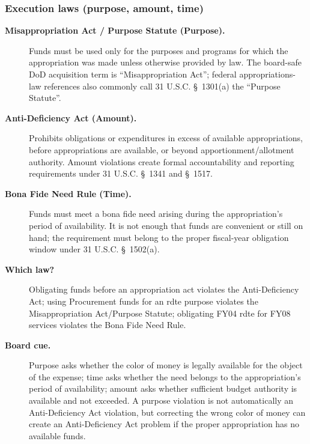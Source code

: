 \documentclass[../main.tex]{subfiles}
\begin{document}
\subsubsection{Execution laws (purpose, amount, time)}
\begin{description}
  \item[\textbf{Misappropriation Act / Purpose Statute (Purpose).}] Funds must be used only for the purposes and programs for which the appropriation was made unless otherwise provided by law. The board-safe DoD acquisition term is ``Misappropriation Act''; federal appropriations-law references also commonly call 31 U.S.C. \S~1301(a) the ``Purpose Statute''\autocite{edo-3-1-4-budget-execution-2025,USC-1301-Purpose,DAU-Misappropriation-Act}.
  \item[\textbf{Anti-Deficiency Act (Amount).}] Prohibits obligations or expenditures in excess of available appropriations, before appropriations are available, or beyond apportionment/allotment authority. Amount violations create formal accountability and reporting requirements under 31 U.S.C. \S~1341 and \S~1517\autocite{edo-3-1-4-budget-execution-2025,USC-1341-ADA,USC-1517-ADA}.
  \item[\textbf{Bona Fide Need Rule (Time).}] Funds must meet a bona fide need arising during the appropriation's period of availability. It is not enough that funds are convenient or still on hand; the requirement must belong to the proper fiscal-year obligation window under 31 U.S.C. \S~1502(a)\autocite{edo-3-1-4-budget-execution-2025,USC-1502-BFN,DAU-Bona-Fide-Need}.
\end{description}

\begin{description}
  \item[\textbf{Which law?}] Obligating funds before an appropriation act violates the Anti-Deficiency Act; using Procurement funds for an \ac{rdte} purpose violates the Misappropriation Act/Purpose Statute; obligating FY04 \ac{rdte} for FY08 services violates the Bona Fide Need Rule\autocite{edo-3-1-4-budget-execution-2025}.
\end{description}

\begin{description}
  \item[\textbf{Board cue.}] Purpose asks whether the color of money is legally available for the object of the expense; time asks whether the need belongs to the appropriation's period of availability; amount asks whether sufficient budget authority is available and not exceeded. A purpose violation is not automatically an Anti-Deficiency Act violation, but correcting the wrong color of money can create an Anti-Deficiency Act problem if the proper appropriation has no available funds.
\end{description}
\end{document}
